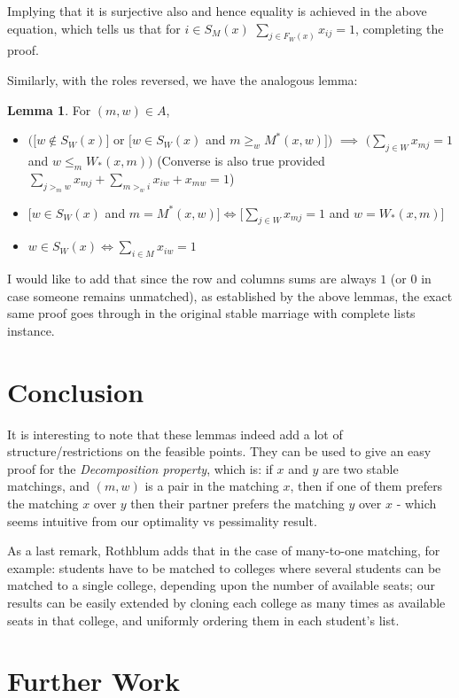 \documentclass[a4paper,UKenglish,cleveref, autoref]{lipics-v2019}
\theoremstyle{definition}
\newtheorem*{lemma*}{Lemma}
\begin{document}
Implying that it is surjective also and hence equality is achieved in the above equation, which tells us that for $i \in S_M(x)$ $\sum_{j \in F_W(x)} x_{ij} = 1$, completing the proof.

Similarly, with the roles reversed, we have the analogous lemma:
\begin{lemma*}
For $(m,w) \in A$,
\begin{itemize}
    \item $\Big( \big[w \not \in S_W(x)\big]$ or $\big[w \in S_W(x)$ and $m \geq_w M^*(x,w)\big] \Big)$ $\implies$ $\Big(\sum_{j \in W} x_{mj} = 1$ and $w \leq_m W_*(x,m)\Big)$ (Converse is also true provided $\sum_{j >_m w} x_{mj} + \sum_{m >_ w i} x_{iw} + x_{mw} = 1$)
    \item $\big[ w \in S_W(x)$ and  $m = M^*(x,w) \big] \iff \big[ \sum_{j \in W} x_{mj} = 1$ and $w = W_*(x,m) \big]$
    \item $w \in S_W(x) \iff \sum_{i \in M} x_{iw} = 1$
\end{itemize}
\end{lemma*}

I would like to add that since the row and columns sums are always $1$ (or $0$ in case someone remains unmatched), as established by the above lemmas, the exact same proof goes through in the original stable marriage with complete lists instance.

\section{Conclusion}

It is interesting to note that these lemmas indeed add a lot of structure/restrictions on the feasible points. They can be used to give an easy proof for the \textsl{Decomposition property}, which is: if $x$ and $y$ are two stable matchings, and $(m,w)$ is a pair in the matching $x$, then if one of them prefers the matching $x$ over $y$ then their partner prefers the matching $y$ over $x$ - which seems intuitive from our optimality vs pessimality result.

As a last remark, Rothblum adds that in the case of many-to-one matching, for example: students have to be matched to colleges where several students can be matched to a single college, depending upon the number of available seats; our results can be easily extended by cloning each college as many times as available seats in that college, and uniformly ordering them in each student's list.

\section{Further Work}
\end{document}
